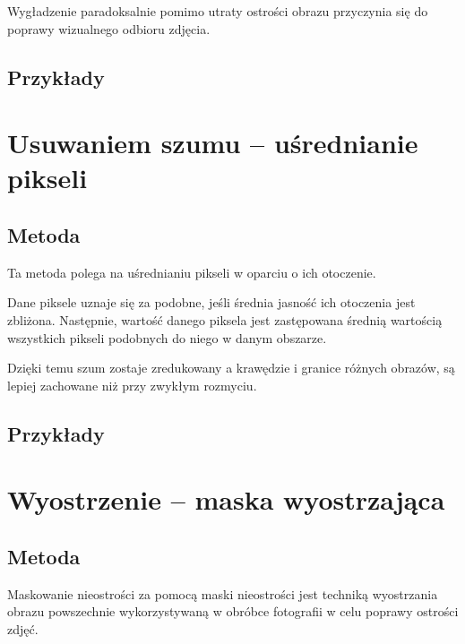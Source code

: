 \documentclass[]{mwart}
\begin{document}
Wygładzenie paradoksalnie pomimo utraty ostrości obrazu przyczynia się do poprawy wizualnego odbioru zdjęcia.

\subsection{Przykłady}






\section{Usuwaniem szumu -- uśrednianie pikseli }
\subsection{Metoda}
Ta metoda polega na uśrednianiu pikseli w oparciu o ich otoczenie.

Dane piksele uznaje się za podobne, jeśli średnia jasność ich otoczenia
jest zbliżona. Następnie, wartość danego piksela jest zastępowana
średnią wartością wszystkich pikseli podobnych do niego w danym obszarze.

Dzięki temu szum zostaje zredukowany a krawędzie i granice różnych obrazów,
są lepiej zachowane niż przy zwykłym rozmyciu.


\subsection{Przykłady}




\section{Wyostrzenie -- maska wyostrzająca      }

\subsection{Metoda}
Maskowanie nieostrości za pomocą maski nieostrości jest techniką wyostrzania obrazu
powszechnie wykorzystywaną w obróbce fotografii w celu poprawy ostrości zdjęć.
\end{document}
